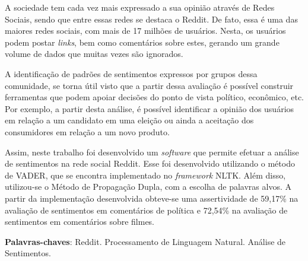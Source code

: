 \setlength{\absparsep}{18pt} %
\begin{resumo}
A sociedade tem cada vez mais expressado a sua opinião através de Redes
Sociais, sendo que entre essas redes se destaca o
Reddit. De fato, essa é uma das maiores redes sociais, com mais de 17
milhões de usuários. Nesta, os usuários podem postar \textit{links}, bem como
comentários sobre estes, gerando um grande volume de dados que muitas vezes são
ignorados.

A identificação de padrões de sentimentos expressos por grupos dessa comunidade,
se torna útil visto que a partir dessa avaliação é possível construir
ferramentas que podem apoiar decisões do ponto de vista político, econômico, etc. Por exemplo, a partir desta análise, é
possível identificar a opinião dos usuários em relação a um candidato em uma eleição ou ainda a aceitação dos
consumidores em relação a um novo produto.

Assim, neste trabalho foi desenvolvido um \textit{software} que permite efetuar
a análise de sentimentos na rede social Reddit. Esse foi desenvolvido
utilizando o método de \ac{VADER}, que se encontra implementado no
\textit{framework} \ac{NLTK}. Além disso, utilizou-se o Método de Propagação
Dupla, com a escolha de palavras alvos. A partir da implementação desenvolvida
obteve-se uma assertividade de 59,17\% na avaliação de sentimentos em comentários de política
e 72,54\% na avaliação de sentimentos em comentários sobre filmes.


 \textbf{Palavras-chaves}: Reddit. Processamento de Linguagem Natural. Análise de Sentimentos.
\end{resumo}

